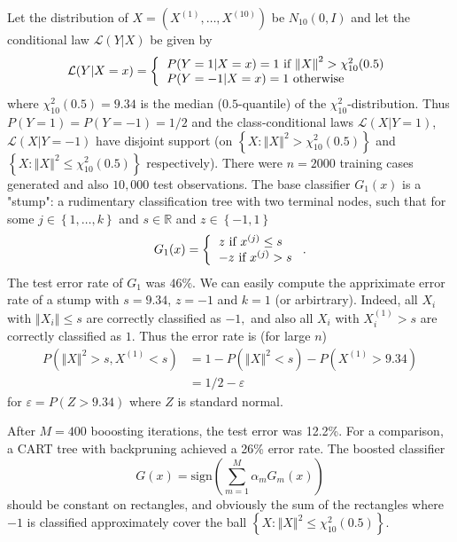 \documentclass[11pt,twoside]{article}%
\theoremstyle{change}
\begin{document}
Let the distribution of $X=\left(  X^{(1)},\ldots,X^{(10)}\right)  $ be
$N_{10}(0,I)$ and let the conditional law $\mathcal{L}(Y|X)$ be given by
\[
\mathcal{L}(Y|X=x)=\left\{
\begin{tabular}
[c]{l}%
$P(Y=1|X=x)=1$ if $\left\Vert X\right\Vert ^{2}>\chi_{10}^{2}(0.5)$\\
$P(Y=-1|X=x)=1$ otherwise
\end{tabular}
\right.
\]
where $\chi_{10}^{2}(0.5)=9.34$ is the median ($0.5$-quantile) of the
$\chi_{10}^{2}$-distribution. Thus $P(Y=1)=P(Y=-1)=1/2$ and the
class-conditional laws $\mathcal{L}(X|Y=1)$, $\mathcal{L}(X|Y=-1)$ have
disjoint support (on $\left\{  X:\left\Vert X\right\Vert ^{2}>\chi_{10}%
^{2}(0.5)\right\}  $ and $\left\{  X:\left\Vert X\right\Vert ^{2}\leq\chi
_{10}^{2}(0.5)\right\}  $ respectively). There were $n=2000$ training cases
generated and also $10,000$ test observations. The base classifier $G_{1}(x)$
is a "stump": a rudimentary classification tree with two terminal nodes, such
that for some $j\in\left\{  1,\ldots,k\right\}  $ and $s\in\mathbb{R}$ and
$z\in\left\{  -1,1\right\}  $
\[
G_{1}(x)=\left\{
\begin{tabular}
[c]{l}%
$z$ if $x^{(j)}\leq s$\\
$-z$ if $x^{(j)}>s$%
\end{tabular}
\right.  .
\]
The test error rate of $G_{1}$ was $46\%$. We can easily compute the
appriximate error rate of a stump with $s=9.34$, $z=-1$ and $k=1$ (or
arbirtrary)$.$ Indeed, all $X_{i}$ with $\left\Vert X_{i}\right\Vert \leq s$
are correctly classified as $-1,$ and also all $X_{i}$ with $X_{i}^{(1)}>s$
are correctly classified as $1$. Thus the error rate is (for large $n$)
\begin{align*}
P\left(  \left\Vert X\right\Vert ^{2}>s,X^{(1)}<s\right)   & =1-P\left(
\left\Vert X\right\Vert ^{2}<s\right)  -P\left(  X^{(1)}>9.34\right) \\
& =1/2-\varepsilon
\end{align*}
for $\varepsilon=P\left(  Z>9.34\right)  $ where $Z$ is standard normal.

After $M=400$ booosting iterations, the test error was 12.2\%. For a
comparison, a CART tree with backpruning achieved a 26\% error rate. The
boosted classifier
\[
G(x)=\mathrm{sign}\left(  \sum_{m=1}^{M}\alpha_{m}G_{m}(x)\right)
\]
should be constant on rectangles, and obviously the sum of the rectangles
where $-1$ is classified approximately cover the ball $\left\{  X:\left\Vert
X\right\Vert ^{2}\leq\chi_{10}^{2}(0.5)\right\}  $.
\end{document}
